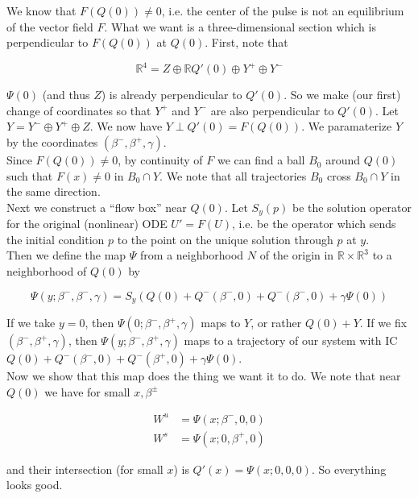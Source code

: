 \documentclass[12pt]{article}
\def\R{{\mathbb R}}
\begin{document}
We know that $F(Q(0)) \neq 0$, i.e. the center of the pulse is not an equilibrium of the vector field $F$. What we want is a three-dimensional section which is perpendicular to $F(Q(0))$ at $Q(0)$. First, note that

\[
\R^4 = Z \oplus \R Q'(0) \oplus Y^+ \oplus Y^-
\]

$\Psi(0)$ (and thus $Z$) is already perpendicular to $Q'(0)$. So we make (our first) change of coordinates so that $Y^+$ and $Y^-$ are also perpendicular to $Q'(0)$. Let $Y = Y^- \oplus Y^+ \oplus Z$. We now have $Y \perp Q'(0) = F(Q(0))$. We paramaterize $Y$ by the coordinates $(\beta^-, \beta^+, \gamma)$.\\

Since $F(Q(0)) \neq 0$, by continuity of $F$ we can find a ball $B_0$ around $Q(0)$ such that $F(x) \neq 0$ in $B_0 \cap Y$. We note that all trajectories $B_0$ cross $B_0 \cap Y$ in the same direction.\\

Next we construct a ``flow box'' near $Q(0)$. Let $S_y(p)$ be the solution operator for the original (nonlinear) ODE $U' = F(U)$, i.e. be the operator which sends the initial condition $p$ to the point on the unique solution through $p$ at $y$. \\

Then we define the map $\Psi$ from a neighborhood $N$ of the origin in $\R \times \R^3$ to a neighborhood of $Q(0)$ by

\begin{equation}
\Psi(y; \beta^-, \beta^-, \gamma) = S_y(Q(0) + Q^-(\beta^-, 0) + Q^-(\beta^-, 0) + \gamma \Psi(0))
\end{equation}

If we take $y = 0$, then $\Psi(0; \beta^-, \beta^+, \gamma)$ maps to $Y$, or rather $Q(0) + Y$. If we fix $(\beta^-, \beta^+, \gamma)$, then $\Psi(y; \beta^-, \beta^+, \gamma)$ maps to a trajectory of our system with IC $Q(0) + Q^-(\beta^-,0) + Q^-(\beta^+,0)  + \gamma \Psi(0)$.\\ 

Now we show that this map does the thing we want it to do. We note that near $Q(0)$ we have for small $x, \beta^\pm$

\begin{align*}
W^u &= \Psi(x; \beta^-, 0, 0) \\
W^s &= \Psi(x; 0, \beta^+, 0) 
\end{align*}

and their intersection (for small $x$) is $Q'(x) = \Psi(x; 0, 0, 0)$. So everything looks good.\\
\end{document}
